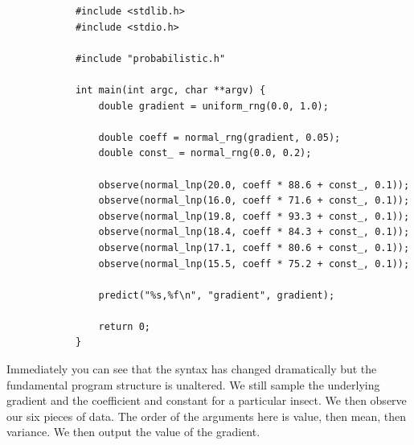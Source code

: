 \documentclass[a4paper]{article}
\begin{document}
\begin{center}
	\begin{varwidth}{\linewidth}
		\small
		\begin{verbatim}
			#include <stdlib.h>
			#include <stdio.h>

			#include "probabilistic.h"

			int main(int argc, char **argv) {
			    double gradient = uniform_rng(0.0, 1.0);

			    double coeff = normal_rng(gradient, 0.05);
			    double const_ = normal_rng(0.0, 0.2);

			    observe(normal_lnp(20.0, coeff * 88.6 + const_, 0.1));
			    observe(normal_lnp(16.0, coeff * 71.6 + const_, 0.1));
			    observe(normal_lnp(19.8, coeff * 93.3 + const_, 0.1));
			    observe(normal_lnp(18.4, coeff * 84.3 + const_, 0.1));
			    observe(normal_lnp(17.1, coeff * 80.6 + const_, 0.1));
			    observe(normal_lnp(15.5, coeff * 75.2 + const_, 0.1));

			    predict("%s,%f\n", "gradient", gradient);

			    return 0;
			}
		\end{verbatim}
	\end{varwidth}
\end{center}
Immediately you can see that the syntax has changed dramatically but the fundamental program structure is unaltered. We still sample the underlying gradient and the coefficient and constant for a particular insect. We then observe our six pieces of data. The order of the arguments here is value, then mean, then variance. We then output the value of the gradient.
\end{document}
